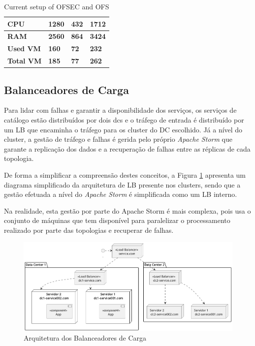 \begin{table}[h!]
\begin{tabular}{|l|l|l|l|}
    \rowcolor[HTML]{D9D9D9} 
    \textbf{CPU} & \textbf{1280} & \textbf{432} & \textbf{1712} \\ \hline
    \rowcolor[HTML]{D9D9D9} 
    \textbf{RAM} & \textbf{2560} & \textbf{864} & \textbf{3424} \\ \hline
    \rowcolor[HTML]{D9D9D9} 
    \textbf{Used VM} & \textbf{160} & \textbf{72} & \textbf{232} \\ \hline
    \rowcolor[HTML]{D9D9D9} 
    \textbf{Total VM} & \textbf{185} & \textbf{77} & \textbf{262} \\ \hline
  \end{tabular}
  \caption{Current setup of OFSEC and OFS}
  \label{tab:current_setup}
\end{table}

\subsection{Balanceadores de Carga}

Para lidar com falhas e garantir a disponibilidade dos serviços, os serviços de catálogo estão
distribuídos por dois \glspl{dc} e o tráfego de entrada é distribuído por um \ac{LB} que encaminha
o tráfego para os \gls{cluster} do \ac{DC} escolhido. Já a nível do \gls{cluster}, a gestão de 
tráfego e falhas é gerida pelo próprio \textit{Apache Storm} que garante a replicação dos dados
e a recuperação de falhas entre as réplicas de cada topologia.

De forma a simplificar a compreensão destes conceitos, a Figura \ref{lb} apresenta um diagrama
simplificado da arquitetura de \ac{LB} presente nos \glspl{cluster}, sendo que a gestão efetuada
a nível do \textit{Apache Storm} é simplificada como um \ac{LB} interno.

Na realidade, esta gestão por parte do Apache Storm é mais complexa, pois usa o conjunto de
máquinas que tem disponível para paralelizar o processamento realizado por parte das topologias e
recuperar de falhas.

\begin{figure}[H]
  \centerline{\includegraphics[scale=0.45]{media/content/analise/lb.png}}
  \caption{Arquitetura dos Balanceadores de Carga}
  \label{lb}
\end{figure}

